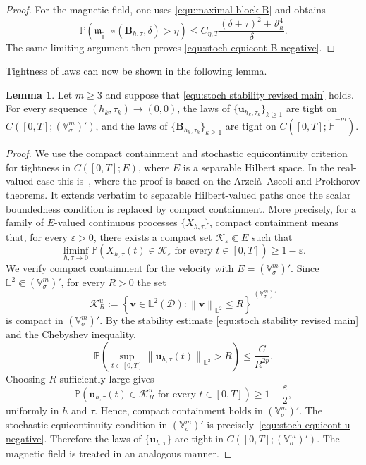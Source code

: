 \documentclass[11pt, reqno]{amsart}
\theoremstyle{definition}
\newtheorem{lemma}[theorem]{Lemma}
\numberwithin{equation}{section}
\newcommand{\bff}{\boldsymbol}
\newcommand{\bb}{\mathbb}
\newcommand{\norm}[2]{\left\|{#1}\right\|_{#2}}
\begin{document}
\begin{proof}
	For the magnetic field, one uses \eqref{equ:maximal block B} and obtains
	\[
	\bb P\left(
	\mathfrak m_{\widetilde{\bb H}^{-m}}
	(\bff B_{h,\tau},\delta)>\eta
	\right)
	\le
	C_{\eta,T}
	\frac{(\delta+\tau)^2+\vartheta_h^4}{\delta}.
	\]
	The same limiting argument then proves
	\eqref{equ:stoch equicont B negative}.
\end{proof}

Tightness of laws can now be shown in the following lemma.

\begin{lemma}\label{lem:tightness negative path spaces}
	Let $m\ge3$ and suppose that \eqref{equ:stoch stability revised main} holds. For every sequence $(h_k,\tau_k)\to(0,0)$, the laws of
	$\{\bff u_{h_k,\tau_k}\}_{k\ge1}$ are tight on $C([0,T];(\bb{V}^m_\sigma)')$, and the laws of $\{\bff B_{h_k,\tau_k}\}_{k\ge1}$ are tight on $C([0,T];\widetilde{\bb H}^{-m})$.
\end{lemma}

\begin{proof}
	We use the compact containment and stochastic equicontinuity criterion for
	tightness in $C([0,T];E)$, where $E$ is a separable Hilbert
	space. In the real-valued case this is~\cite[Theorem~7.2--7.4]{Bil99}, where the proof is based on the Arzel\`a--Ascoli and Prokhorov theorems. It extends verbatim to separable Hilbert-valued paths once the scalar boundedness condition is replaced by compact containment. More precisely, for a family of $E$-valued continuous processes $\{X_{h,\tau}\}$, compact containment
	means that, for every $\varepsilon>0$, there exists a compact set
	$\mathcal K_\varepsilon\Subset E$ such that
	\[
	\liminf_{h,\tau\to0}
	\bb P\left(
	X_{h,\tau}(t)\in\mathcal K_\varepsilon
	\text{ for every }t\in[0,T]
	\right)
	\ge 1-\varepsilon .
	\]
	We verify compact containment for the velocity with
	$E=(\bb{V}^m_\sigma)'$. Since $\bb L^2 \Subset(\bb{V}^m_\sigma)'$,
	for every $R>0$ the set
	\[
	\mathcal K_R^u
	:=
	\overline{
		\left\{
		\bff v\in\bb L^2(\mathscr D):
		\norm{\bff v}{\bb L^2}\le R
		\right\}
	}^{\,(\bb{V}^m_\sigma)'}
	\]
	is compact in $(\bb{V}^m_\sigma)'$. By the stability estimate \eqref{equ:stoch stability revised main} and the Chebyshev inequality,
	\[
	\bb P\left(
	\sup_{t\in[0,T]}
	\norm{\bff u_{h,\tau}(t)}{\bb L^2}>R
	\right)
	\le \frac{C}{R^{2p}}.
	\]
	Choosing $R$ sufficiently large gives
	\[
	\bb P\left(
	\bff u_{h,\tau}(t)\in\mathcal K_R^u
	\text{ for every }t\in[0,T]
	\right)
	\ge 1-\frac{\varepsilon}{2},
	\]
	uniformly in $h$ and $\tau$. Hence, compact containment holds in
	$(\bb{V}^m_\sigma)'$. The stochastic equicontinuity condition in $(\bb{V}^m_\sigma)'$ is precisely~\eqref{equ:stoch equicont u negative}. Therefore the laws of
	$\{\bff u_{h,\tau}\}$ are tight in
	$C([0,T];(\bb{V}^m_\sigma)')$.
	The magnetic field is treated in an analogous manner.
\end{proof}
\end{document}
